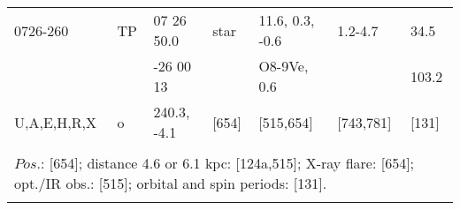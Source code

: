 \documentclass{aa}
\begin{document}
\begin{table*}[h]
\begin{tabular}{p{2.5cm}p{1cm}p{1.8cm}p{2.3cm}p{3.3cm}p{2.0cm}p{2.2cm}}
\noalign{\smallskip}
\hline
\noalign{\smallskip}
 0726-260     &   TP   & 07 26 50.0      & star            & 11.6, 0.3, -0.6    &  1.2-4.7             & 34.5       \\
                       &            & -26 00 13        &                     & O8-9Ve, 0.6      &                           &   103.2    \\
U,A,E,H,R,X  &  o      & 240.3, -4.1       &   [654]      &    [515,654]         &  [743,781]        &   [131]      \\
\\ 
\multicolumn{7}{p{17.5cm}}{
$Pos$.: [654]; distance 4.6 or 6.1 kpc: [124a,515]; X-ray flare: [654]; opt./IR obs.: [515]; orbital and spin periods: [131].    }\\

\noalign{\smallskip}
\hline
\end{tabular}
\end{table*}
\end{document}
